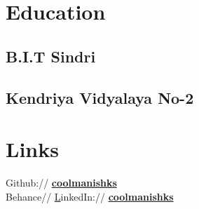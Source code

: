 \documentclass[a4paper]{manish-resume} %
\begin{document}
\begin{minipage}[t]{0.33\textwidth} %


\section{Education} 

\subsection{B.I.T Sindri}


\sectionspace %


\sectionspace %


\subsection{Kendriya Vidyalaya No-2}


\sectionspace %


\section{Links} 

Github:// \href{https://github.com/coolmanishks}{\bf coolmanishks} \\
Behance// \href{}
LinkedIn:// \href{https://www.linkedin.com/coolmanishks}{\bf coolmanishks} \\



\end{minipage}
\end{document}
